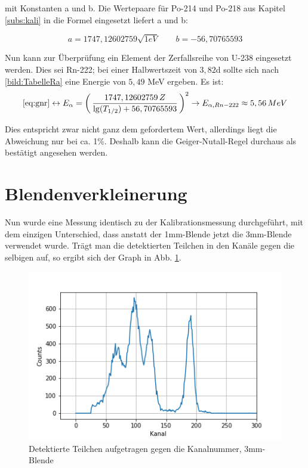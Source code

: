 mit Konstanten a und b. Die Wertepaare für Po-214 und Po-218 aus Kapitel \ref{subs:kali} in die Formel eingesetzt liefert a und b:

\begin{equation}
    a = 1747,12602759 \sqrt{1eV} \qquad b = -56,70765593
\end{equation}

Nun kann zur Überprüfung ein Element der Zerfallsreihe von U-238 eingesetzt werden. Dies sei Rn-222; bei einer Halbwertszeit von 
$3,82$d sollte sich nach \ref{bild:TabelleRa} eine Energie von $5,49$ MeV ergeben. Es ist: \\

\begin{equation*}
    \ref{eq:gnr}  \leftrightarrow E_{\alpha} = \biggl(\,\frac{1747,12602759 \, Z}{\lg(T_{1/2})+56,70765593}\, \biggr)^2 \\
    \to E_{\alpha, Rn-222} \approx 5,56 \, MeV
\end{equation*}

Dies entspricht zwar nicht ganz dem gefordertem Wert, allerdings liegt die Abweichung nur bei ca. 1\%. Deshalb kann die 
Geiger-Nutall-Regel durchaus als bestätigt angesehen werden.





\section{Blendenverkleinerung}

Nun wurde eine Messung identisch zu der Kalibrationsmessung durchgeführt, mit dem einzigen Unterschied, dass anstatt der 1mm-Blende 
jetzt die 3mm-Blende verwendet wurde. Trägt man die detektierten Teilchen in den Kanäle gegen die selbigen auf, so ergibt sich der 
Graph in Abb. \ref{bild:blende}. \\

\begin{figure}[h]
    \centering
    \includegraphics[scale=0.75]{Bilder/blende.png}
    \caption{Detektierte Teilchen aufgetragen gegen die Kanalnummer, 3mm-Blende}
    \label{bild:blende}
\end{figure}

